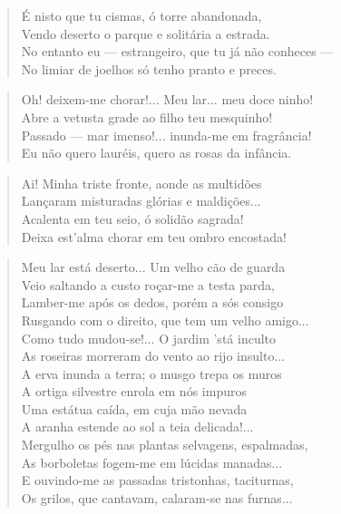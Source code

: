 \begin{anexosenv}
\begin{verse}
É nisto que tu cismas, ó torre abandonada, \\
Vendo deserto o parque e solitária a estrada. \\
No entanto eu — estrangeiro, que tu já não conheces — \\
No limiar de joelhos só tenho pranto e preces. \\
\end{verse}

\begin{verse}
Oh! deixem-me chorar!... Meu lar... meu doce ninho! \\
Abre a vetusta grade ao filho teu mesquinho! \\
Passado — mar imenso!... inunda-me em fragrância! \\
Eu não quero lauréis, quero as rosas da infância. \\
\end{verse}

\begin{verse}
Ai! Minha triste fronte, aonde as multidões \\
Lançaram misturadas glórias e maldições... \\
Acalenta em teu seio, ó solidão sagrada! \\
Deixa est'alma chorar em teu ombro encostada! \\
\end{verse}

\begin{verse}
Meu lar está deserto... Um velho cão de guarda \\
Veio saltando a custo roçar-me a testa parda, \\
Lamber-me após os dedos, porém a sós consigo \\
Rusgando com o direito, que tem um velho amigo... \\
Como tudo mudou-se!... O jardim 'stá inculto \\
As roseiras morreram do vento ao rijo insulto... \\
A erva inunda a terra; o musgo trepa os muros \\
A ortiga silvestre enrola em nós impuros \\
Uma estátua caída, em cuja mão nevada \\
A aranha estende ao sol a teia delicada!... \\
Mergulho os pés nas plantas selvagens, espalmadas, \\
As borboletas fogem-me em lúcidas manadas... \\
E ouvindo-me as passadas tristonhas, taciturnas, \\
Os grilos, que cantavam, calaram-se nas furnas... \\
\end{verse}


\end{anexosenv}
